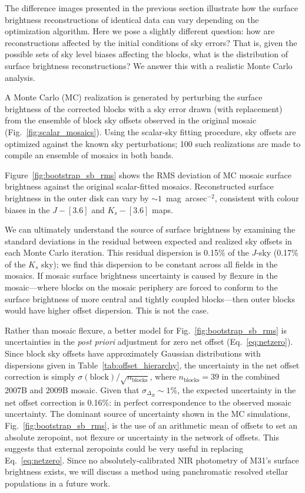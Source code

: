 \documentclass[iop]{emulateapj}
\newcommand{\Fig}[1]{Fig.~\ref{fig:#1}}  %
\newcommand{\Eq}[1]{Eq.~\ref{eq:#1}}  %
\newcommand{\Tab}[1]{Table~\ref{tab:#1}}  %
\begin{document}
The difference images presented in the previous section illustrate how the surface brightness reconstructions of identical data can vary depending on the optimization algorithm.
Here we pose a slightly different question: how are reconstructions affected by the initial conditions of sky errors?
That is, given the possible sets of sky level biases affecting the blocks, what is the distribution of surface brightness reconstructions?
We answer this with a realistic Monte Carlo analysis.

A Monte Carlo (MC) realization is generated by perturbing the surface brightness of the corrected blocks with a sky error drawn (with replacement) from the ensemble of block sky offsets observed in the original mosaic (\Fig{scalar_mosaics}).
Using the scalar-sky fitting procedure, sky offsets  are optimized against the known sky perturbations; 100 such realizations are made to compile an ensemble of mosaics in both bands.

Figure~\ref{fig:bootstrap_sb_rms} shows the RMS deviation of MC mosaic surface brightness against the original scalar-fitted mosaics.
Reconstructed surface brightness in the outer disk can vary by $\sim 1$~mag~arcsec$^{-2}$, consistent with colour biases in the $J-[3.6]$ and $K_s-[3.6]$ maps.

We can ultimately understand the source of surface brightness by examining the standard deviations in the residual between expected and realized sky offsets in each Monte Carlo iteration.
This residual dispersion is 0.15\% of the $J$-sky (0.17\% of the $K_s$ sky); we find this dispersion to be constant across all fields in the mosaics.
If mosaic surface brightness uncertainty is caused by flexure in the mosaic---where blocks on the mosaic periphery are forced to conform to the surface brightness of more central and tightly coupled blocks---then outer blocks would have higher offset dispersion.
This is not the case.

Rather than mosaic flexure, a better model for \Fig{bootstrap_sb_rms} is uncertainties in the \textit{post priori} adjustment for zero net offset (\Eq{netzero}).
Since block sky offsets have approximately Gaussian distributions with dispersions given in \Tab{offset_hierarchy}, the uncertainty in the net offset correction is simply $\sigma(\mathrm{block})/\sqrt{n_\mathrm{blocks}}$, where $n_\mathrm{blocks}=39$ in the combined 2007B and 2009B mosaic.
Given that $\sigma_{\Delta_B}\sim 1\%$, the expected uncertainty in the net offset correction is 0.16\%: in perfect correspondence to the observed mosaic uncertainty.
The dominant source of uncertainty shown in the MC simulations, \Fig{bootstrap_sb_rms}, is the use of an arithmetic mean of offsets to set an absolute zeropoint, not flexure or uncertainty in the network of offsets.
This suggests that external zeropoints could be very useful in replacing \Eq{netzero}.
Since no absolutely-calibrated NIR photometry of M31's surface brightness exists, we will discuss a method using panchromatic resolved stellar populations in a future work.
\end{document}

